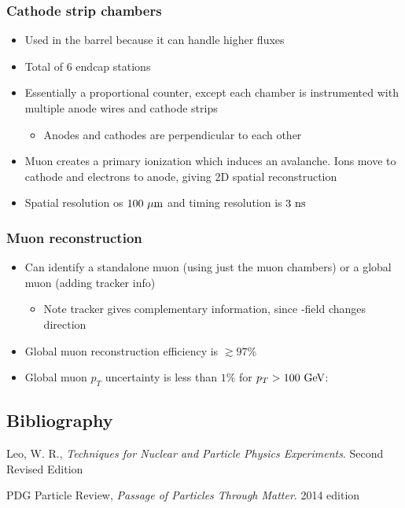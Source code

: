 \subsubsection{Cathode strip chambers}
\begin{itemize}
  \item Used in the barrel because it can handle higher fluxes
  \item Total of 6 endcap stations
  \item Essentially a proportional counter, except each chamber is instrumented with multiple anode wires and cathode strips
  \begin{itemize}
    \item Anodes and cathodes are perpendicular to each other
  \end{itemize}
  \item Muon creates a primary ionization which induces an avalanche. Ions move to cathode and electrons to anode, giving 2D spatial reconstruction
  \item Spatial resolution os $100~\mu\text{m}$ and timing resolution is $3~\text{ns}$
\end{itemize}

\subsubsection{Muon reconstruction}
\begin{itemize}
  \item Can identify a standalone muon (using just the muon chambers) or a global muon (adding tracker info)
  \begin{itemize}
    \item Note tracker gives complementary information, since \B-field changes direction
  \end{itemize}
  \item Global muon reconstruction efficiency is $\gtrsim 97\%$
  \item Global muon $p_T$ uncertainty is less than $1\%$ for $p_T>100~\text{GeV}$:
\end{itemize}

\begin{appendices}
\section{Bibliography}

Leo, W. R., \emph{Techniques for Nuclear and Particle Physics Experiments}. Second Revised Edition
\vspace{5mm}

\noindent PDG Particle Review, \emph{Passage of Particles Through Matter}. 2014 edition

\end{appendices}


